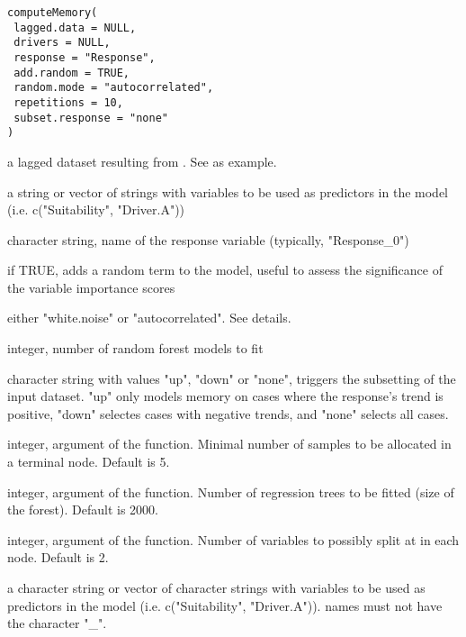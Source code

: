 \documentclass[letterpaper]{book}
\begin{document}
%
\begin{Usage}
\begin{verbatim}
computeMemory(
 lagged.data = NULL,
 drivers = NULL,
 response = "Response",
 add.random = TRUE,
 random.mode = "autocorrelated",
 repetitions = 10,
 subset.response = "none"
)
\end{verbatim}
\end{Usage}
%
\begin{Arguments}
\begin{ldescription}
\item[\code{lagged.data}] a lagged dataset resulting from . See  as example.

\item[\code{drivers}] a string or vector of strings with variables to be used as predictors in the model (i.e. c("Suitability", "Driver.A"))

\item[\code{response}] character string, name of the response variable (typically, "Response\_0")

\item[\code{add.random}] if TRUE, adds a random term to the model, useful to assess the significance of the variable importance scores

\item[\code{random.mode}] either "white.noise" or "autocorrelated". See details.

\item[\code{repetitions}] integer, number of random forest models to fit

\item[\code{subset.response}] character string with values "up", "down" or "none", triggers the subsetting of the input dataset. "up" only models memory on cases where the response's trend is positive, "down" selectes cases with negative trends, and "none" selects all cases.

\item[\code{min.node.size}] integer, argument of the  function. Minimal number of samples to be allocated in a terminal node. Default is 5.

\item[\code{num.trees}] integer, argument of the  function. Number of regression trees to be fitted (size of the forest). Default is 2000.

\item[\code{mtry}] integer, argument of the  function. Number of variables to possibly split at in each node. Default is 2.

\item[\code{drivers}] a character string or vector of character strings with variables to be used as predictors in the model (i.e. c("Suitability", "Driver.A")).   names must not have the character "\_".
\end{ldescription}
\end{Arguments}
\end{document}
